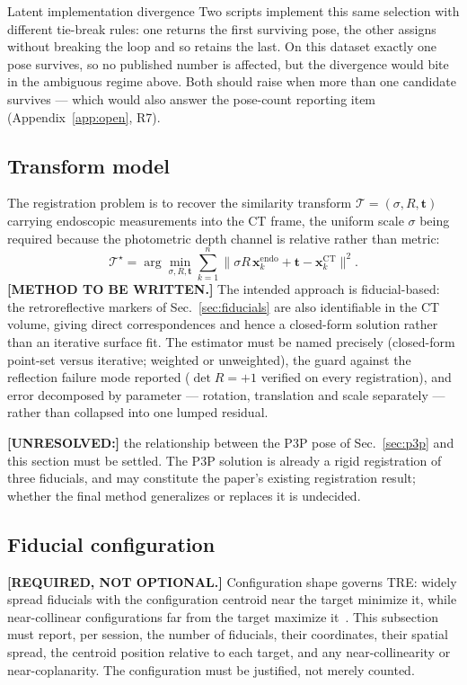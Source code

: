 \documentclass[journal,10pt]{IEEEtran}
\newcommand{\TODO}[1]{\textcolor{todoRed}{\textbf{[#1]}}}
\newcommand{\vecx}{\bm{x}}
\begin{document}
\begin{notebox}{Latent implementation divergence}
Two scripts implement this same selection with different tie-break rules: one
returns the first surviving pose, the other assigns without breaking the loop and
so retains the last. On this dataset exactly one pose survives, so no published
number is affected, but the divergence would bite in the ambiguous regime above.
Both should raise when more than one candidate survives --- which would also
answer the pose-count reporting item (Appendix~\ref{app:open}, R7).
\end{notebox}

\subsection{Transform model}\label{sec:regmodel}
The registration problem is to recover the similarity transform
$\mathcal{T}=(\sigma, R, \bm{t})$ carrying endoscopic measurements into the CT
frame, the uniform scale $\sigma$ being required because the photometric depth
channel is relative rather than metric:
\begin{equation}
\mathcal{T}^\star = \arg\min_{\sigma,R,\bm{t}} \sum_{k=1}^{n}
\bigl\lVert \sigma R\,\vecx_k^\mathrm{endo} + \bm{t}
          - \vecx_k^\mathrm{CT} \bigr\rVert^2 .
\end{equation}
\TODO{METHOD TO BE WRITTEN.} The intended approach is fiducial-based: the
retroreflective markers of Sec.~\ref{sec:fiducials} are also identifiable in the
CT volume, giving direct correspondences and hence a closed-form solution rather
than an iterative surface fit. The estimator must be named precisely (closed-form
point-set versus iterative; weighted or unweighted), the guard against the
reflection failure mode reported ($\det R = +1$ verified on every registration),
and error decomposed by parameter --- rotation, translation and scale separately
--- rather than collapsed into one lumped residual.

\TODO{UNRESOLVED:} the relationship between the P3P pose of Sec.~\ref{sec:p3p}
and this section must be settled. The P3P solution is already a rigid
registration of three fiducials, and may constitute the paper's existing
registration result; whether the final method generalizes or replaces it is
undecided.

\subsection{Fiducial configuration}\label{sec:regconfig}
\TODO{REQUIRED, NOT OPTIONAL.} Configuration shape governs TRE: widely spread
fiducials with the configuration centroid near the target minimize it, while
near-collinear configurations far from the target maximize it~\cite{west2001}.
This subsection must report, per session, the number of fiducials, their
coordinates, their spatial spread, the centroid position relative to each target,
and any near-collinearity or near-coplanarity. The configuration must be
justified, not merely counted.
\end{document}
